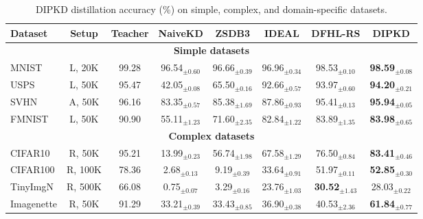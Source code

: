 \documentclass[12pt, a4paper, twoside]{book}
\numberwithin{equation}{chapter}
\theoremstyle{plain}
\theoremstyle{definition}
\theoremstyle{remark}
\newcommand{\boldtight}[1]{{\fontseries{b}\selectfont #1}}
\begin{document}
\begin{table}[ht]
  \centering
  \begin{threeparttable}
    \caption[DIPKD accuracy on simple, complex, and domain-specific datasets]{
      DIPKD distillation accuracy (\%) on simple, complex, and domain-specific datasets.
    }
    \label{tab:standard-all}
    \small
    \begin{tabular}{l c c c c c c c}
      \toprule
      \boldtight{Dataset} & \boldtight{Setup} & \boldtight{Teacher} & \boldtight{NaiveKD} & \boldtight{ZSDB3} & \boldtight{IDEAL} & \boldtight{DFHL-RS} & \boldtight{DIPKD} \\
      \midrule

      \multicolumn{8}{c}{\textbf{Simple datasets}} \\
      \midrule
      MNIST    & L, 20K  & 99.28 & 96.54$_{\pm 0.60}$           & 96.66$_{\pm 0.39}$           & 96.96$_{\pm 0.34}$ & 98.53$_{\pm 0.10}$          & \textbf{98.59}$_{\pm 0.08}$ \\
      USPS     & L, 50K  & 95.47 & 42.05$_{\pm 0.08}$           & 65.50$_{\pm 0.16}$           & 92.66$_{\pm 0.57}$ & 93.97$_{\pm 0.60}$          & \textbf{94.20}$_{\pm 0.21}$ \\
      SVHN     & A, 50K  & 96.16 & 83.35$_{\pm 0.57}$           & 85.38$_{\pm 1.69}$           & 87.86$_{\pm 0.93}$ & 95.41$_{\pm 0.13}$          & \textbf{95.94}$_{\pm 0.05}$ \\
      FMNIST   & L, 50K  & 90.90 & 55.11$_{\pm 1.23}$           & 71.60$_{\pm 2.35}$           & 82.84$_{\pm 1.22}$ & 83.89$_{\pm 1.35}$          & \textbf{83.98}$_{\pm 0.65}$ \\
      \midrule

      \multicolumn{8}{c}{\textbf{Complex datasets}} \\
      \midrule
      CIFAR10  & R, 50K  & 95.21 & 13.99$_{\pm 0.23}$           & 56.74$_{\pm 1.98}$           & 67.58$_{\pm 1.29}$ & 76.50$_{\pm 0.84}$          & \textbf{83.41}$_{\pm 0.46}$ \\
      CIFAR100 & R, 100K & 78.36 & \phantom{0}2.68$_{\pm 0.13}$ & \phantom{0}9.19$_{\pm 0.39}$ & 33.64$_{\pm 0.91}$ & 51.97$_{\pm 0.11}$          & \textbf{52.85}$_{\pm 0.30}$ \\
      TinyImgN & R, 500K & 66.08 & \phantom{0}0.75$_{\pm 0.07}$ & \phantom{0}3.29$_{\pm 0.16}$ & 23.76$_{\pm 1.03}$ & \textbf{30.52}$_{\pm 1.43}$ & 28.03$_{\pm 0.22}$ \\
      Imagenette & R, 50K  & 91.29 & 33.21$_{\pm 0.39}$         & 33.43$_{\pm 0.85}$           & 36.90$_{\pm 0.38}$ & 40.53$_{\pm 2.36}$          & \textbf{61.84}$_{\pm 0.77}$ \\
      \midrule


\end{tabular}
\end{threeparttable}
\end{table}
\end{document}
